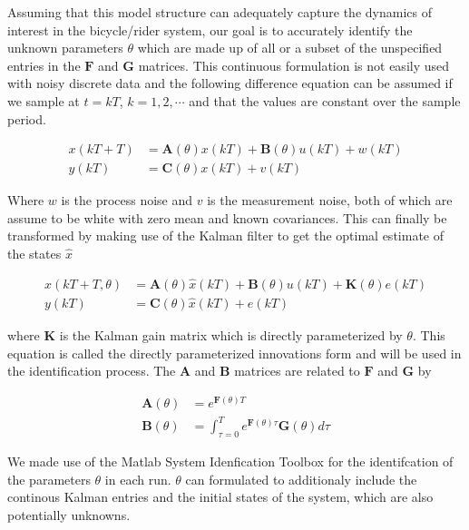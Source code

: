 \documentclass[twocolumn,10pt]{asme2e}
\begin{document}
Assuming that this model structure can adequately capture the dynamics of
interest in the bicycle/rider system, our goal is to accurately identify the
unknown parameters $\theta$ which are made up of all or a subset of the
unspecified entries in the $\mathbf{F}$ and $\mathbf{G}$ matrices. This
continuous formulation is not easily used with noisy discrete data and the
following difference equation can be assumed if we sample at $t=kT$,
$k=1,2,\cdots$ and that the values are constant over the sample period.

\begin{equation}
	\begin{split}
		x(kT + T) & = \mathbf{A}(\theta)x(kT) + \mathbf{B}(\theta)u(kT) + w(kT)\\
		y(kT) & = \mathbf{C}(\theta)x(kT) + v(kT)
	\end{split}
\end{equation}

Where $w$ is the process noise and $v$ is the measurement noise, both of which
are assume to be white with zero mean and known covariances. This can finally
be transformed by making use of the Kalman filter to get the optimal estimate
of the states $\hat{x}$

\begin{equation}
	\begin{split}
		\hat{x}(kT + T, \theta) & = \mathbf{A}(\theta)\hat{x}(kT) +
			\mathbf{B}(\theta)u(kT) + \mathbf{K}(\theta)e(kT)\\
		y(kT) & = \mathbf{C}(\theta)\hat{x}(kT) + e(kT)
	\end{split}
\end{equation}

where $\mathbf{K}$ is the Kalman gain matrix which is directly parameterized by
$\theta$. This equation is called the directly parameterized innovations form
and will be used in the identification process. The $\mathbf{A}$ and
$\mathbf{B}$ matrices are related to $\mathbf{F}$ and $\mathbf{G}$ by

\begin{equation}
	\begin{split}
		\mathbf{A}(\theta) & = e^{\mathbf{F}(\theta)T}\\
		\mathbf{B}(\theta) & = \int_{\tau=0}^T e^{\mathbf{F}(\theta)\tau}
		\mathbf{G}(\theta) d\tau
	\end{split}
\end{equation}

We made use of the Matlab System Idenfication Toolbox for the identifcation of
the parameters $\theta$ in each run. $\theta$ can formulated to additionaly
include the continous Kalman entries and the initial states of the system,
which are also potentially unknowns.
\end{document}
